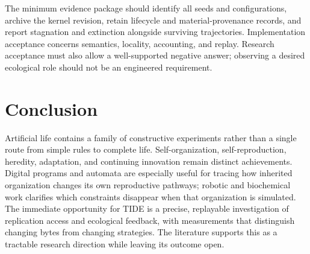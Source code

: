 The minimum evidence package should identify all seeds and configurations,
archive the kernel revision, retain lifecycle and material-provenance records,
and report stagnation and extinction alongside surviving trajectories.
Implementation acceptance concerns semantics, locality, accounting, and
replay. Research acceptance must also allow a well-supported negative answer;
observing a desired ecological role should not be an engineered requirement.

\section{Conclusion}
Artificial life contains a family of constructive experiments rather than a
single route from simple rules to complete life. Self-organization,
self-reproduction, heredity, adaptation, and continuing innovation remain
distinct achievements. Digital programs and automata are especially useful
for tracing how inherited organization changes its own reproductive pathways;
robotic and biochemical work clarifies which constraints disappear when that
organization is simulated. The immediate opportunity for TIDE is a precise,
replayable investigation of replication access and ecological feedback, with
measurements that distinguish changing bytes from changing strategies. The
literature supports this as a tractable research direction while leaving its
outcome open.
